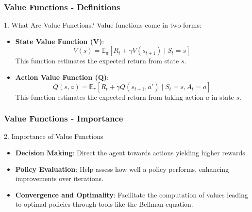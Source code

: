 \documentclass[aspectratio=169]{beamer}
\begin{document}
\begin{frame}[fragile]
    \frametitle{Value Functions - Definitions}
    
    \begin{block}{1. What Are Value Functions?}
        Value functions come in two forms:
    \end{block}
    
    \begin{itemize}
        \item {\bf State Value Function (V)}: 
        \[
        V(s) = \mathbb{E}_\pi \left[ R_t + \gamma V(s_{t+1}) \mid S_t = s \right]
        \]
        This function estimates the expected return from state \( s \).
        
        \item {\bf Action Value Function (Q)}: 
        \[
        Q(s, a) = \mathbb{E}_\pi \left[ R_t + \gamma Q(s_{t+1}, a') \mid S_t = s, A_t = a \right]
        \]
        This function estimates the expected return from taking action \( a \) in state \( s \).
    \end{itemize}
\end{frame}

\begin{frame}[fragile]
    \frametitle{Value Functions - Importance}
    
    \begin{block}{2. Importance of Value Functions}
    \end{block}
    \begin{itemize}
        \item {\bf Decision Making}: Direct the agent towards actions yielding higher rewards.
        \item {\bf Policy Evaluation}: Help assess how well a policy performs, enhancing improvements over iterations.
        \item {\bf Convergence and Optimality}: Facilitate the computation of values leading to optimal policies through tools like the Bellman equation.
    \end{itemize}
\end{frame}
\end{document}
